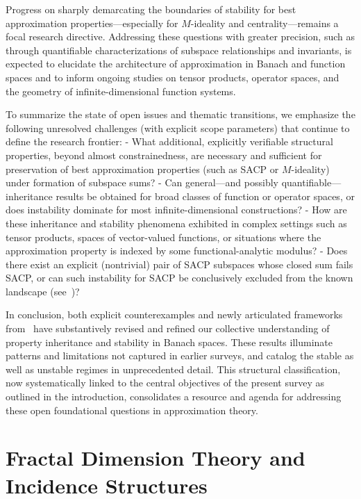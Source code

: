 \documentclass[sigconf]{acmart}
\begin{document}
Progress on sharply demarcating the boundaries of stability for best approximation properties—especially for $M$-ideality and centrality—remains a focal research directive. Addressing these questions with greater precision, such as through quantifiable characterizations of subspace relationships and invariants, is expected to elucidate the architecture of approximation in Banach and function spaces and to inform ongoing studies on tensor products, operator spaces, and the geometry of infinite-dimensional function systems.

To summarize the state of open issues and thematic transitions, we emphasize the following unresolved challenges (with explicit scope parameters) that continue to define the research frontier:
- What additional, explicitly verifiable structural properties, beyond almost constrainedness, are necessary and sufficient for preservation of best approximation properties (such as SACP or $M$-ideality) under formation of subspace sums?
- Can general—and possibly quantifiable—inheritance results be obtained for broad classes of function or operator spaces, or does instability dominate for most infinite-dimensional constructions?
- How are these inheritance and stability phenomena exhibited in complex settings such as tensor products, spaces of vector-valued functions, or situations where the approximation property is indexed by some functional-analytic modulus?
- Does there exist an explicit (nontrivial) pair of SACP subspaces whose closed sum fails SACP, or can such instability for SACP be conclusively excluded from the known landscape (see~\cite{ref103})?

In conclusion, both explicit counterexamples and newly articulated frameworks from~\cite{ref103} have substantively revised and refined our collective understanding of property inheritance and stability in Banach spaces. These results illuminate patterns and limitations not captured in earlier surveys, and catalog the stable as well as unstable regimes in unprecedented detail. This structural classification, now systematically linked to the central objectives of the present survey as outlined in the introduction, consolidates a resource and agenda for addressing these open foundational questions in approximation theory.

\section{Fractal Dimension Theory and Incidence Structures}
\end{document}
